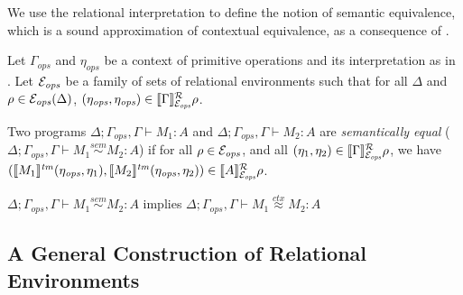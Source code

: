 We use the relational interpretation to define the notion of semantic
equivalence, which is a sound approximation of contextual equivalence,
as a consequence of .
\begin{definition}
  Let $\Gamma_{\mathit{ops}}$ and $\eta_{\mathit{ops}}$ be a context
  of primitive operations and its interpretation as in
  . Let $\mathcal{E}_{\mathit{ops}}$ be a
  family of sets of relational environments such that for all $\Delta$
  and $\rho \in \mathcal{E}_{\mathit{ops}}(\Delta)$,
  $(\eta_{\mathit{ops}}, \eta_{\mathit{ops}}) \in
  \llbracket \Gamma \rrbracket^{\mathcal{R}}_{\mathcal{E}_{\mathit{ops}}}{\rho}$.

  Two programs $\Delta; \Gamma_{\mathit{ops}}, \Gamma \vdash M_1 : A$
  and $\Delta; \Gamma_{\mathit{ops}}, \Gamma \vdash M_2 : A$ are
  \emph{semantically equal} ($\Delta; \Gamma_{\mathit{ops}}, \Gamma
  \vdash M_1 \stackrel{sem}\sim M_2 : A$) if for all $\rho \in
  \mathcal{E}_{\mathit{ops}}$, and all $(\eta_1,\eta_2) \in
  \llbracket \Gamma \rrbracket^{\mathcal{R}}_{\mathcal{E}_{\mathit{ops}}}{\rho}$, we have
  $(\llbracket M_1 \rrbracket^{\mathit{tm}}(\eta_{\mathit{ops}},
  \eta_1),\llbracket M_2 \rrbracket^{\mathit{tm}}(\eta_{\mathit{ops}}, \eta_2)) \in
  \llbracket A \rrbracket^{\mathcal{R}}_{\mathcal{E}_{\mathit{ops}}}{\rho}$.
\end{definition}

\begin{theorem}\label{thm:soundness}
  $\Delta; \Gamma_{\mathit{ops}}, \Gamma \vdash M_1 \stackrel{sem}\sim M_2 : A$ implies
  $\Delta; \Gamma_{\mathit{ops}}, \Gamma \vdash M_1 \stackrel{ctx}\approx M_2 : A$
\end{theorem}

\subsection{A General Construction of Relational Environments}
\label{sec:constr-rel-env}

\newcommand{\Free}{\mathrm{Free}}
\newcommand{\semSort}[1]{\llbracket #1 \rrbracket^{\mathcal{S}}}
\newcommand{\semIndexExp}[1]{\llbracket #1 \rrbracket^{\mathcal{I}}}

